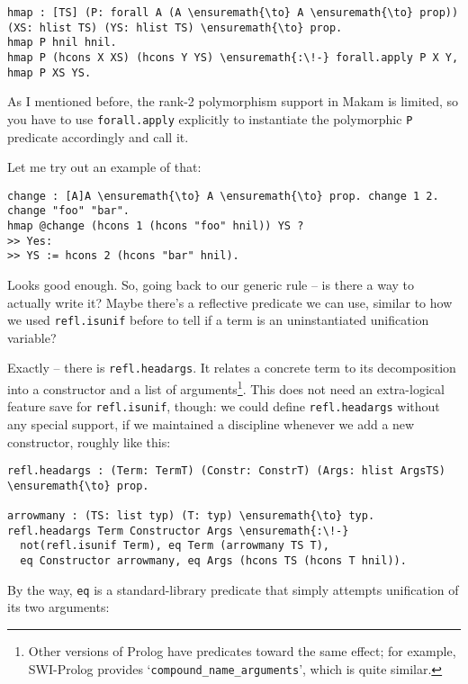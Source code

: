 \begin{verbatim}
hmap : [TS] (P: forall A (A \ensuremath{\to} A \ensuremath{\to} prop)) (XS: hlist TS) (YS: hlist TS) \ensuremath{\to} prop.
hmap P hnil hnil.
hmap P (hcons X XS) (hcons Y YS) \ensuremath{:\!-} forall.apply P X Y, hmap P XS YS.
\end{verbatim}

\noindent
As I mentioned before, the rank-2 polymorphism support in Makam is
limited, so you have to use \texttt{forall.apply} explicitly to
instantiate the polymorphic \texttt{P} predicate accordingly and call
it.

\heroSTUDENT{} Let me try out an example of that:

\begin{verbatim}
change : [A]A \ensuremath{\to} A \ensuremath{\to} prop. change 1 2. change "foo" "bar".
hmap @change (hcons 1 (hcons "foo" hnil)) YS ?
>> Yes:
>> YS := hcons 2 (hcons "bar" hnil).
\end{verbatim}

\noindent
Looks good enough. So, going back to our generic rule -- is there a way
to actually write it? Maybe there's a reflective predicate we can use,
similar to how we used \texttt{refl.isunif} before to tell if a term is
an uninstantiated unification variable?

\heroADVISOR{} Exactly -- there is \texttt{refl.headargs}. It relates a
concrete term to its decomposition into a constructor and a list of
arguments\footnote{Other versions of Prolog have predicates toward the same effect; for example, SWI-Prolog \citep{wielemaker2012swi} provides `\texttt{compound\_{}name\_{}arguments}', which is quite similar.}.
This does not need an extra-logical feature save for
\texttt{refl.isunif}, though: we could define \texttt{refl.headargs}
without any special support, if we maintained a discipline whenever we
add a new constructor, roughly like this:

\begin{verbatim}
refl.headargs : (Term: TermT) (Constr: ConstrT) (Args: hlist ArgsTS) \ensuremath{\to} prop.

arrowmany : (TS: list typ) (T: typ) \ensuremath{\to} typ.
refl.headargs Term Constructor Args \ensuremath{:\!-}
  not(refl.isunif Term), eq Term (arrowmany TS T),
  eq Constructor arrowmany, eq Args (hcons TS (hcons T hnil)).
\end{verbatim}

By the way, \texttt{eq} is a standard-library predicate that simply
attempts unification of its two arguments:


